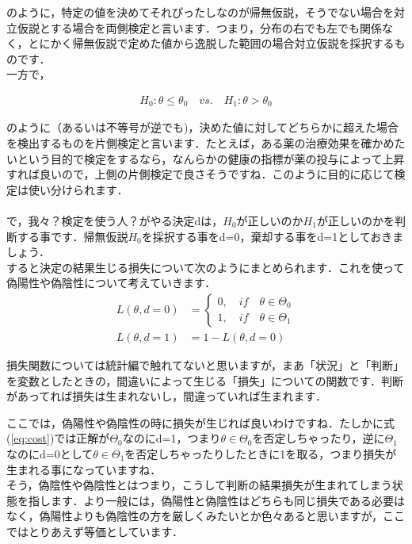 \documentclass[11pt,a4paper,uplatex]{ujreport} 	%
\begin{document}
のように，特定の値を決めてそれぴったしなのが帰無仮説，そうでない場合を対立仮説とする場合を両側検定と言います．つまり，分布の右でも左でも関係なく，とにかく帰無仮説で定めた値から逸脱した範囲の場合対立仮説を採択するものです．\\

一方で，

\begin{align}
  H_0:\theta \leq \theta_0 \quad vs. \quad H_1 : \theta > \theta_0
\end{align}

のように（あるいは不等号が逆でも)，決めた値に対してどちらかに超えた場合を検出するものを片側検定と言います．たとえば，ある薬の治療効果を確かめたいという目的で検定をするなら，なんらかの健康の指標が薬の投与によって上昇すれば良いので，上側の片側検定で良さそうですね．このように目的に応じて検定は使い分けられます．\\\\

で，我々？検定を使う人？がやる決定dは，$H_0$が正しいのか$H_1$が正しいのかを判断する事です．帰無仮説$H_0$を採択する事をd=0，棄却する事をd=1としておきましょう．\\

すると決定の結果生じる損失について次のようにまとめられます．これを使って偽陽性や偽陰性について考えていきます．\\


\begin{align}
  L(\theta, d=0) &= \left\{
    \begin{array}{l}
    0, \quad if \quad \theta \in \Theta_0\\
    1, \quad if \quad \theta \in \Theta_1
    \end{array}
  \right.\nonumber \\
  L(\theta, d=1) &= 1-L(\theta, d=0) 
  \label{eq:cost}
\end{align}

損失関数については統計編で触れてないと思いますが，まあ「状況」と「判断」を変数としたときの，間違いによって生じる「損失」についての関数です．判断があってれば損失は生まれないし，間違っていれば生まれます．

ここでは，偽陽性や偽陰性の時に損失が生じれば良いわけですね．たしかに式(\ref{eq:cost})では正解が$\Theta_0$なのにd=1，つまり$\theta \in \Theta_0$を否定しちゃったり，逆に$\Theta_1$なのにd=0として$\theta \in \Theta_1$を否定しちゃったりしたときに1を取る，つまり損失が生まれる事になっていますね．\\

そう，偽陰性や偽陰性とはつまり，こうして判断の結果損失が生まれてしまう状態を指します．より一般には，偽陽性と偽陰性はどちらも同じ損失である必要はなく，偽陽性よりも偽陰性の方を厳しくみたいとか色々あると思いますが，ここではとりあえず等価としています．
\end{document}
